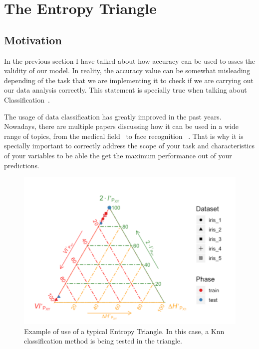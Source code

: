 \section{The Entropy Triangle}
\subsection{Motivation}

In the previous section I have talked about how accuracy can be used to asses the validity of our model. In reality, the accuracy value can be somewhat misleading depending of the task that we are implementing it to check if we are carrying out our data analysis correctly. This statement is specially true when talking about Classification~\cite{val:pel:14a}.\par

The usage of data classification has greatly improved in the past years. Nowadays, there are multiple papers discussing how it can be used in a wide range of topics, from the medical field~\cite{Medical_Classification} to face recognition~\cite{Balaban_2015} . That is why it is specially important to correctly address the scope of your task and characteristics of your variables to be able the get the maximum performance out of your predictions.\par
%
\begin{figure}[H]
 \centering
  \includegraphics[width=15cm]{Figuras_tfg/Example_ET}
  \caption{Example of use of a typical Entropy Triangle. In this case, a Knn classification method is being tested in the triangle.}
 \label{fig:figure_example_et}
\end{figure} 

